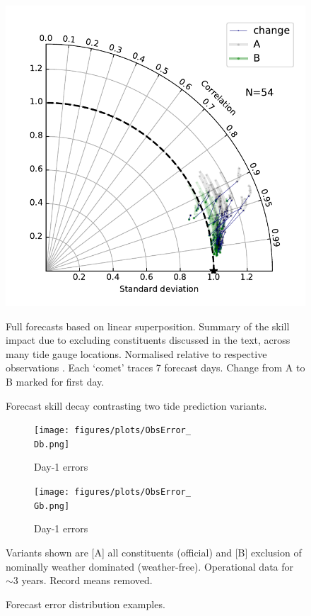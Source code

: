 \begin{figure}[!hbt] \centering
        \includegraphics[width=\figwidthBig]{figures/plots/taylorDoubleCount.pdf}
        \caption{Forecast skill decay contrasting two tide prediction variants.}
        {Full forecasts based on linear superposition. Summary of the skill impact due to excluding constituents discussed in the text, across many tide gauge locations. Normalised relative to respective observations \citep{Taylor:2000wp}. Each `comet' traces 7 forecast days.  Change from A to B marked for first day.}   
        \label{fig:aggStatsComet}
\end{figure}   

\begin{figure}[!hbt] \centering
    \begin{subfigure}[b]{\figwidthHalf}
        \texttt{[image: figures/plots/ObsError\_\\Db.png]}
        \caption{Day-1 errors \Dname{}}
    \end{subfigure}
    \begin{subfigure}[b]{\figwidthHalf}
        \texttt{[image: figures/plots/ObsError\_\\Gb.png]}
        \caption{Day-1 errors \Gname{}}
    \end{subfigure}
    \caption{Forecast error distribution examples.}
    {Variants shown are [A] all constituents (official) and [B] exclusion of nominally weather dominated (weather-free).  Operational data for $\sim3$ years. Record means removed.} 
    \label{fig:aggStatsPdf}
\end{figure}   


